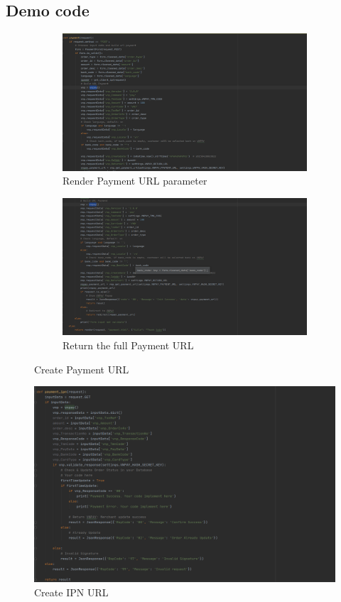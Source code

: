 \documentclass[12pt,a4paper]{article}
\begin{document}
\subsection{Demo code}
\begin{figure}[h!]
	\centering
  	\begin{subfigure}[b]{\linewidth}
  		\includegraphics[width=\linewidth]{payment-1.png}
    	\caption{Render Payment URL parameter}
  	\end{subfigure}
  	\begin{subfigure}[b]{\linewidth}
    	\includegraphics[width=\linewidth]{payment-2.png}
    	\caption{Return the full Payment URL}
  	\end{subfigure}
  	\caption{Create Payment URL}
  	\label{fig:purl}
\end{figure}

\begin{figure}[h!]
  	\includegraphics[width=\linewidth]{payment-ipn.png}
    \caption{Create IPN URL}
  	\label{fig:iurl}
\end{figure}
\end{document}
